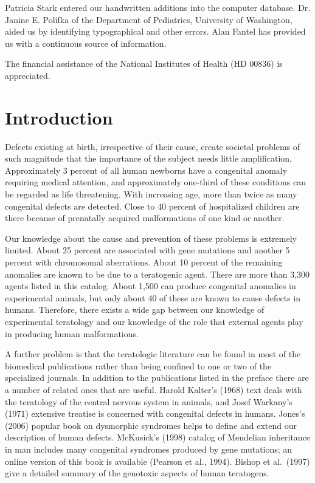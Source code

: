 Patricia Stark entered our handwritten additions into the computer
database.  Dr. Janine E. Polifka of the Department of Pediatrics,
University of Washington, aided us by identifying typographical and
other errors. Alan Fantel has provided us with a continuous source of information.

The financial assistance of the National Institutes of Health (HD 00836)
is appreciated.


\clearemptydoublepage
\chapter{Introduction}


Defects existing at birth, irrespective of their cause, create
societal problems of such magnitude that the importance of the 
subject needs little
amplification. Approximately 3 percent of all human newborns have a
congenital anomaly requiring medical attention, and approximately
one-third of these conditions can be regarded as life threatening.
With increasing age, more than twice as many congenital defects are
detected.  Close to 40 percent of hospitalized children are there because
of prenatally acquired malformations of one kind or another.

Our knowledge about the cause and prevention of these problems is
extremely limited. About 25 percent are associated with gene
mutations and another 5 percent with chromosomal aberrations. About
10 percent of the remaining anomalies are known to be due to a
teratogenic agent.  There are more than 3,300 agents listed in this
catalog. About 1,500 can produce congenital anomalies in experimental
animals, but only about 40 of these are known to cause defects in 
humans. Therefore, there exists a wide gap between our
knowledge of experimental teratology and our knowledge of
the role that external
agents play in producing human malformations.

A further problem is that the teratologic literature can be found in
most of the biomedical publications rather than being
confined to one or two of the specialized journals.  In addition to
the publications listed in the preface there are a number of related ones
that are useful.  Harold Kalter's (1968) text deals with the
teratology of the central nervous system in animals, and Josef
Warkany's (1971) extensive treatise is concerned with congenital
defects in humans. Jones's (2006) popular book on dysmorphic
syndromes helps to define and extend our description of human
defects.  McKusick's (1998) catalog of Mendelian inheritance in man
includes many congenital syndromes produced by gene mutations;  an
online version of this book is available (Pearson et al., 1994).
Bishop et al.~(1997) give a detailed summary of the genotoxic
aspects of human teratogens.

